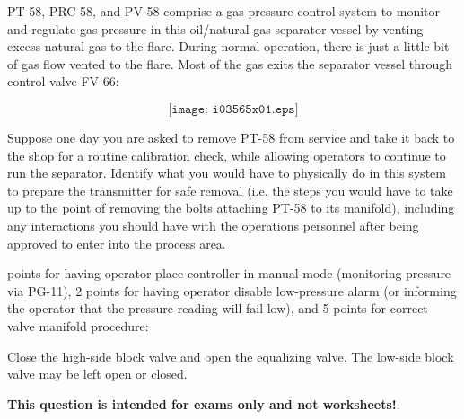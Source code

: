 

PT-58, PRC-58, and PV-58 comprise a gas pressure control system to monitor and regulate gas pressure in this oil/natural-gas separator vessel by venting excess natural gas to the flare.  During normal operation, there is just a little bit of gas flow vented to the flare.  Most of the gas exits the separator vessel through control valve FV-66:

$$\texttt{[image: i03565x01.eps]}$$

Suppose one day you are asked to remove PT-58 from service and take it back to the shop for a routine calibration check, while allowing operators to continue to run the separator.  Identify what you would have to physically do in this system to prepare the transmitter for safe removal (i.e. the steps you would have to take up to the point of removing the bolts attaching PT-58 to its manifold), including any interactions you should have with the operations personnel after being approved to enter into the process area.







 points for having operator place controller in manual mode (monitoring pressure via PG-11), 2 points for having operator disable low-pressure alarm (or informing the operator that the pressure reading will fail low), and 5 points for correct valve manifold procedure:

\vskip 10pt

Close the high-side block valve and open the equalizing valve.  The low-side block valve may be left open or closed.







{\bf This question is intended for exams only and not worksheets!}.



